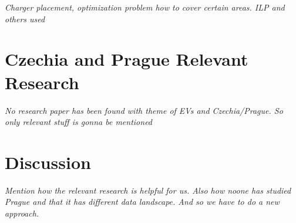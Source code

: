 \textit{Charger placement, optimization problem how to cover certain areas. ILP and others used}


\section{Czechia and Prague Relevant Research}

\textit{No research paper has been found with theme of EVs and Czechia/Prague. So only relevant stuff is gonna be mentioned}





\section{Discussion}

\textit{Mention how the relevant research is helpful for us. Also how noone has studied Prague and that it has different data landscape. And so we have to do a new approach.}

